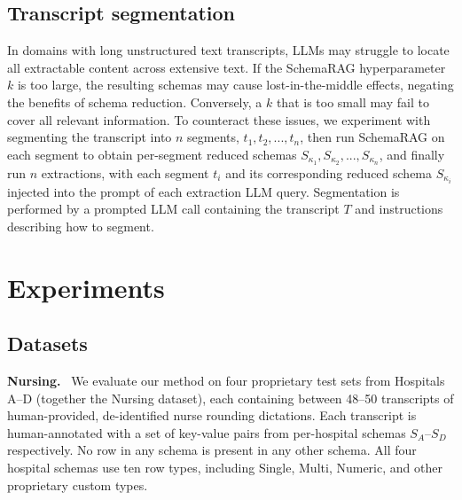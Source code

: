 \documentclass[11pt]{article}
\begin{document}
\subsection{Transcript segmentation}

In domains with long unstructured text transcripts, LLMs may struggle to locate all extractable content across extensive text. If the SchemaRAG hyperparameter $k$ is too large, the resulting schemas may cause lost-in-the-middle effects, negating the benefits of schema reduction. Conversely, a $k$ that is too small may fail to cover all relevant information.
To counteract these issues, we experiment with segmenting the transcript into $n$ segments, $t_1, t_2, ..., t_n$, then run SchemaRAG on each segment to obtain per-segment reduced schemas $S_{\kappa_1}, S_{\kappa_2}, ..., S_{\kappa_n}$, and finally run $n$ extractions, with each segment $t_i$ and its corresponding reduced schema $S_{\kappa_i}$ injected into the prompt of each extraction LLM query. Segmentation is performed by a prompted LLM call containing the transcript $T$ and instructions describing how to segment.

\section{Experiments}

\subsection{Datasets}

\textbf{Nursing.}~ We evaluate our method on four proprietary test sets from Hospitals A--D (together the Nursing dataset), each containing between 48--50 transcripts of human-provided, de-identified nurse rounding dictations. Each transcript is human-annotated with a set of key-value pairs from per-hospital schemas $S_{A}$--$S_{D}$ respectively. 
No row in any schema is present in any other schema. All four hospital schemas use ten row types, including Single, Multi, Numeric, and other proprietary custom types. 
\end{document}
